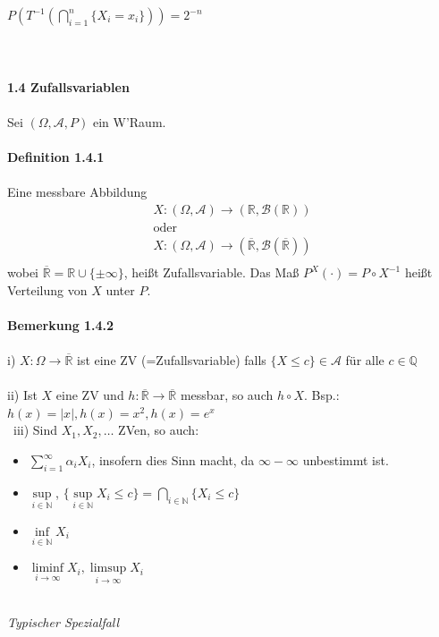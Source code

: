 \documentclass[10pt,a4paper]{report}
\numberwithin{equation}{section}
\numberwithin{figure}{section}
\theoremstyle{plain}
\theoremstyle{definition}
\theoremstyle{plain}
\theoremstyle{definition}
\theoremstyle{remark}
\theoremstyle{plain}
\begin{document}
$P\left(T^{-1}\left(\bigcap\limits_{i=1}^n\{X_i=x_i\}\right)\right)=2^{-n}$\\\\\\\\
\Large{\textbf{1.4 Zufallsvariablen}}\normalsize\\\\
Sei $(\Omega,\mathcal{A},P)$ ein W'Raum.\\\\
\textbf{Definition 1.4.1}\\\\
Eine messbare Abbildung 
\begin{eqnarray*}
X:(\Omega,\mathcal{A}) \to (\mathbb{R},\mathcal{B}(\mathbb{R}))\\
\text{oder}\\
X:(\Omega,\mathcal{A}) \to (\overline{\mathbb{R}},\mathcal{B}(\overline{\mathbb{R}}))\\
\end{eqnarray*}
wobei $\overline{\mathbb{R}}=\mathbb{R}\cup\{\pm \infty \}$, heißt Zufallsvariable. Das Maß $P^X(\cdot)=P\circ X^{-1}$ heißt Verteilung von $X$ unter $P$.\\\\
\textbf{Bemerkung 1.4.2}\\\\
i) $X: \Omega \to \overline{\mathbb{R}}$ ist eine ZV (=Zufallsvariable) falls $\{X\leq c\} \in \mathcal{A}$ für alle $c \in \mathbb{Q}$\\\\
ii) Ist $X$ eine ZV und $h:\overline{\mathbb{R}} \to \overline{\mathbb{R}}$ messbar, so auch $h\circ X$. Bsp.:$h(x)=|x|, h(x)=x^2, h(x)=e^x$\\\
iii) Sind $X_1,X_2,\dots$ ZVen, so auch:
\begin{itemize}
\item $\sum\limits_{i=1}^\infty \alpha_i X_i$, insofern dies Sinn macht, da $\infty-\infty$ unbestimmt ist.
\item $\sup\limits_{i\in \mathbb{N}}$, $\{\sup\limits_{i \in \mathbb{N}} X_i \leq c\}=\bigcap\limits_{i \in \mathbb{N}}\{X_i \leq c\}$
\item $\inf\limits_{i \in \mathbb{N}} X_i$
\item $\liminf\limits_{i \to \infty} X_i, \limsup\limits_{i \to \infty} X_i$
\end{itemize}
$ $\\
\textit{Typischer Spezialfall}\\\\
\end{document}
